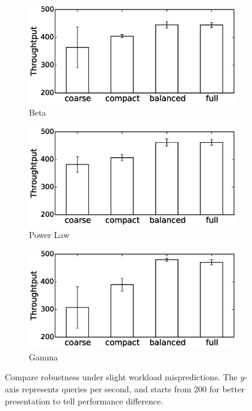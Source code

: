 \begin{figure}[!htbp]
\begin{subfigure}[b]{0.6\textwidth}
    \includegraphics[width=\linewidth]{figures/E38_robustness_std_beta.eps}
    \caption{Beta}
    \label{fig:robustness_beta}
\end{subfigure}
\begin{subfigure}[b]{0.6\textwidth}
    \includegraphics[width=\linewidth]{figures/E38_robustness_std_powerlaw.eps}
    \caption{Power Law}
    \label{fig:robustness_powerlaw}
\end{subfigure}
\begin{subfigure}[b]{0.6\textwidth}
    \includegraphics[width=\linewidth]{figures/E38_robustness_std_gamma.eps}
    \caption{Gamma}
    \label{fig:robustness_gamma}
\end{subfigure}
    \centering
    \caption{Compare robustness under slight workload mispredictions. The $y$-axis represents queries per second, and starts from 200 for better presentation to tell performance difference.}
    \label{fig:robustness}
\end{figure}


